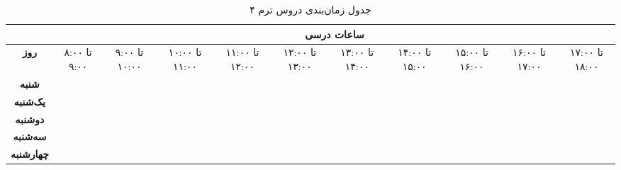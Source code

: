 \documentclass{article}
\begin{document}
	
	\begin{sidewaystable}[h]
		\begin{center}	
			\caption{جدول زمان‌بندی دروس ترم ۴}	
			\begin{tabular}{|c|c|c||c|c||c|c||c|c||c|c|}
				\cline{2-11}
				\multicolumn{1}{c}{}
				& \multicolumn{10}{|c|}{\textbf{ساعات درسی}} \\ \hline
				
				                \textbf{روز} & 
				۸:۰۰ تا ۹:۰۰ & 
				۹:۰۰ تا ۱۰:۰۰ & 
				۱۰:۰۰ تا ۱۱:۰۰ & 
				۱۱:۰۰ تا ۱۲:۰۰ & 
				۱۲:۰۰ تا ۱۳:۰۰ & 
				۱۳:۰۰ تا ۱۴:۰۰ &
				۱۴:۰۰ تا ۱۵:۰۰ & 
				۱۵:۰۰ تا ۱۶:۰۰ & 
				۱۶:۰۰ تا ۱۷:۰۰ & 
				۱۷:۰۰ تا ۱۸:۰۰ \\
				\hline
				\hline
				
				\textbf{شنبه} &
				& & & & & & & & & \\
				\hline
				
				\textbf{یک‌شنبه} &
				& & & & & & & & & \\
				\hline
				
				\textbf{دوشنبه} &
				& & & & & & & & & \\
				\hline
				
				\textbf{سه‌شنبه} &
				& & & & & & & & & \\
				\hline
				
				\textbf{چهارشنبه} &
				& & & & & & & & & \\
				\hline
			\end{tabular}
		\end{center}
	\end{sidewaystable}
\end{document}
